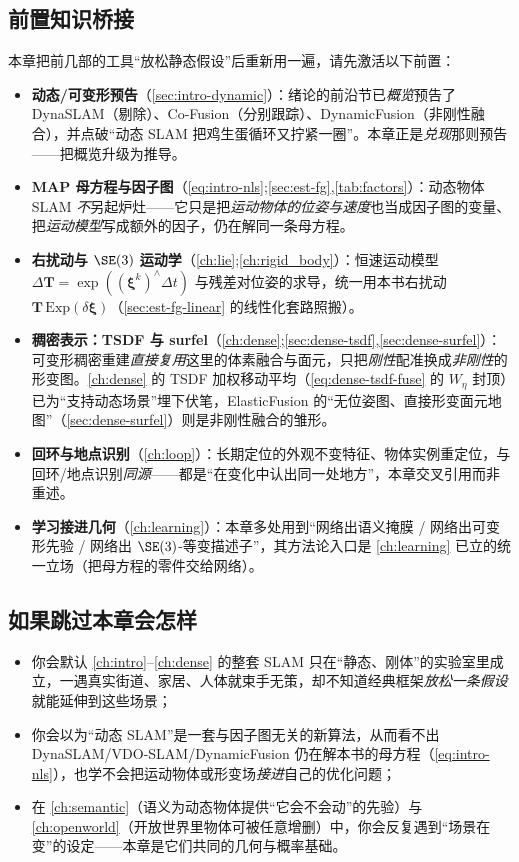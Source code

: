 \subsection*{前置知识桥接}
本章把前几部的工具“放松静态假设”后重新用一遍，请先激活以下前置：
\begin{itemize}
  \item \textbf{动态/可变形预告}（\cref{sec:intro-dynamic}）：绪论的前沿节已\emph{概览}预告了 DynaSLAM（剔除）、Co-Fusion（分别跟踪）、DynamicFusion（非刚性融合），并点破“动态 SLAM 把鸡生蛋循环又拧紧一圈”。本章正是\emph{兑现}那则预告——把概览升级为推导。
  \item \textbf{MAP 母方程与因子图}（\cref{eq:intro-nls};\cref{sec:est-fg},\cref{tab:factors}）：动态物体 SLAM \emph{不}另起炉灶——它只是把\emph{运动物体的位姿与速度}也当成因子图的变量、把\emph{运动模型}写成额外的因子，仍在解同一条母方程。
  \item \textbf{右扰动与 $\SE(3)$ 运动学}（\cref{ch:lie};\cref{ch:rigid_body}）：恒速运动模型 $\Delta\mathbf{T}=\exp((\boldsymbol\xi^k)^\wedge\Delta t)$ 与残差对位姿的求导，统一用本书右扰动 $\mathbf{T}\,\mathrm{Exp}(\delta\boldsymbol\xi)$（\cref{sec:est-fg-linear} 的线性化套路照搬）。
  \item \textbf{稠密表示：TSDF 与 surfel}（\cref{ch:dense};\cref{sec:dense-tsdf},\cref{sec:dense-surfel}）：可变形稠密重建\emph{直接复用}这里的体素融合与面元，只把\emph{刚性}配准换成\emph{非刚性}的形变图。\cref{ch:dense} 的 TSDF 加权移动平均（\cref{eq:dense-tsdf-fuse} 的 $W_\eta$ 封顶）已为“支持动态场景”埋下伏笔，ElasticFusion 的“无位姿图、直接形变面元地图”（\cref{sec:dense-surfel}）则是非刚性融合的雏形。
  \item \textbf{回环与地点识别}（\cref{ch:loop}）：长期定位的外观不变特征、物体实例重定位，与回环/地点识别\emph{同源}——都是“在变化中认出同一处地方”，本章交叉引用而非重述。
  \item \textbf{学习接进几何}（\cref{ch:learning}）：本章多处用到“网络出语义掩膜 / 网络出可变形先验 / 网络出 $\SE(3)$-等变描述子”，其方法论入口是 \cref{ch:learning} 已立的统一立场（把母方程的零件交给网络）。
\end{itemize}

\subsection*{如果跳过本章会怎样}
\begin{itemize}
  \item 你会默认 \cref{ch:intro}--\cref{ch:dense} 的整套 SLAM 只在“静态、刚体”的实验室里成立，一遇真实街道、家居、人体就束手无策，却不知道经典框架\emph{放松一条假设}就能延伸到这些场景；
  \item 你会以为“动态 SLAM”是一套与因子图无关的新算法，从而看不出 DynaSLAM/VDO-SLAM/DynamicFusion 仍在解本书的母方程（\cref{eq:intro-nls}），也学不会把运动物体或形变场\emph{接进}自己的优化问题；
  \item 在 \cref{ch:semantic}（语义为动态物体提供“它会不会动”的先验）与 \cref{ch:openworld}（开放世界里物体可被任意增删）中，你会反复遇到“场景在变”的设定——本章是它们共同的几何与概率基础。
\end{itemize}

